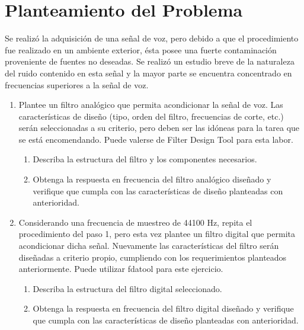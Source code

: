 \documentclass[12pt]{article}
\begin{document}

\newpage

\section{Planteamiento del Problema}
Se realizó la adquisición de una señal de voz, pero debido a que el procedimiento fue realizado
en un ambiente exterior, ésta posee una fuerte contaminación proveniente de fuentes no
deseadas. Se realizó un estudio breve de la naturaleza del ruido contenido en esta señal y la
mayor parte se encuentra concentrado en frecuencias superiores a la señal de voz.
\begin{enumerate}
    \item Plantee un filtro analógico que permita acondicionar la señal de voz. Las características de diseño (tipo, orden del filtro, frecuencias de corte, etc.) serán seleccionadas a su criterio, pero deben ser las idóneas para la tarea que se está encomendando. Puede valerse de Filter Design Tool para esta labor.
    \begin{enumerate}
        \item Describa la estructura del filtro y los componentes necesarios.
        \item Obtenga la respuesta en frecuencia del filtro analógico diseñado y verifique que cumpla con las características de diseño planteadas con anterioridad.
    \end{enumerate}
    \item Considerando una frecuencia de muestreo de 44100 Hz, repita el procedimiento del paso 1, pero esta vez plantee un filtro digital que permita acondicionar dicha señal. Nuevamente las características del filtro serán diseñadas a criterio propio, cumpliendo con los requerimientos planteados anteriormente. Puede utilizar fdatool para este ejercicio.
    \begin{enumerate}
        \item Describa la estructura del filtro digital seleccionado.
        \item Obtenga la respuesta en frecuencia del filtro digital diseñado y verifique que cumpla con las características de diseño planteadas con anterioridad. 
    \end{enumerate}
\end{enumerate}
\end{document}
